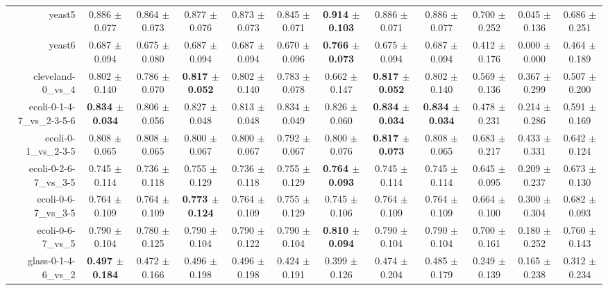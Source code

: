 \begin{table}[!ht]
{\begin{tabular}{r c c c c c c c c c c c}
yeast5 & 0.886 $\pm$ 0.077 & 0.864 $\pm$ 0.073 & 0.877 $\pm$ 0.076 & 0.873 $\pm$ 0.073 & 0.845 $\pm$ 0.071 & \textbf{0.914 $\pm$ 0.103} & 0.886 $\pm$ 0.071 & 0.886 $\pm$ 0.077 & 0.700 $\pm$ 0.252 & 0.045 $\pm$ 0.136 & 0.686 $\pm$ 0.251 \\
yeast6 & 0.687 $\pm$ 0.094 & 0.675 $\pm$ 0.080 & 0.687 $\pm$ 0.094 & 0.687 $\pm$ 0.094 & 0.670 $\pm$ 0.096 & \textbf{0.766 $\pm$ 0.073} & 0.675 $\pm$ 0.094 & 0.687 $\pm$ 0.094 & 0.412 $\pm$ 0.176 & 0.000 $\pm$ 0.000 & 0.464 $\pm$ 0.189 \\
cleveland-0\_vs\_4 & 0.802 $\pm$ 0.140 & 0.786 $\pm$ 0.070 & \textbf{0.817 $\pm$ 0.052} & 0.802 $\pm$ 0.140 & 0.783 $\pm$ 0.078 & 0.662 $\pm$ 0.147 & \textbf{0.817 $\pm$ 0.052} & 0.802 $\pm$ 0.140 & 0.569 $\pm$ 0.136 & 0.367 $\pm$ 0.299 & 0.507 $\pm$ 0.200 \\
ecoli-0-1-4-7\_vs\_2-3-5-6 & \textbf{0.834 $\pm$ 0.034} & 0.806 $\pm$ 0.056 & 0.827 $\pm$ 0.048 & 0.813 $\pm$ 0.048 & 0.834 $\pm$ 0.049 & 0.826 $\pm$ 0.060 & \textbf{0.834 $\pm$ 0.034} & \textbf{0.834 $\pm$ 0.034} & 0.478 $\pm$ 0.231 & 0.214 $\pm$ 0.286 & 0.591 $\pm$ 0.169 \\
ecoli-0-1\_vs\_2-3-5 & 0.808 $\pm$ 0.065 & 0.808 $\pm$ 0.065 & 0.800 $\pm$ 0.067 & 0.800 $\pm$ 0.067 & 0.792 $\pm$ 0.067 & 0.800 $\pm$ 0.076 & \textbf{0.817 $\pm$ 0.073} & 0.808 $\pm$ 0.065 & 0.683 $\pm$ 0.217 & 0.433 $\pm$ 0.331 & 0.642 $\pm$ 0.124 \\
ecoli-0-2-6-7\_vs\_3-5 & 0.745 $\pm$ 0.114 & 0.736 $\pm$ 0.118 & 0.755 $\pm$ 0.129 & 0.736 $\pm$ 0.118 & 0.755 $\pm$ 0.129 & \textbf{0.764 $\pm$ 0.093} & 0.745 $\pm$ 0.114 & 0.745 $\pm$ 0.114 & 0.645 $\pm$ 0.095 & 0.209 $\pm$ 0.237 & 0.673 $\pm$ 0.130 \\
ecoli-0-6-7\_vs\_3-5 & 0.764 $\pm$ 0.109 & 0.764 $\pm$ 0.109 & \textbf{0.773 $\pm$ 0.124} & 0.764 $\pm$ 0.109 & 0.755 $\pm$ 0.129 & 0.745 $\pm$ 0.106 & 0.764 $\pm$ 0.109 & 0.764 $\pm$ 0.109 & 0.664 $\pm$ 0.100 & 0.300 $\pm$ 0.304 & 0.682 $\pm$ 0.093 \\
ecoli-0-6-7\_vs\_5 & 0.790 $\pm$ 0.104 & 0.780 $\pm$ 0.125 & 0.790 $\pm$ 0.104 & 0.790 $\pm$ 0.122 & 0.790 $\pm$ 0.104 & \textbf{0.810 $\pm$ 0.094} & 0.790 $\pm$ 0.104 & 0.790 $\pm$ 0.104 & 0.700 $\pm$ 0.161 & 0.180 $\pm$ 0.252 & 0.760 $\pm$ 0.143 \\
glass-0-1-4-6\_vs\_2 & \textbf{0.497 $\pm$ 0.184} & 0.472 $\pm$ 0.166 & 0.496 $\pm$ 0.198 & 0.496 $\pm$ 0.198 & 0.424 $\pm$ 0.191 & 0.399 $\pm$ 0.126 & 0.474 $\pm$ 0.204 & 0.485 $\pm$ 0.179 & 0.249 $\pm$ 0.139 & 0.165 $\pm$ 0.238 & 0.312 $\pm$ 0.234 \\

\end{tabular}}
\end{table}
